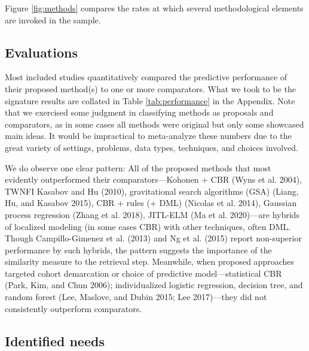 \documentclass{article}
\begin{document}
Figure \ref{fig:methods} compares the rates at which several
methodological elements are invoked in the sample.

\hypertarget{evaluations}{%
\subsection{Evaluations}\label{evaluations}}

Most included studies quantitatively compared the predictive performance
of their proposed method(s) to one or more comparators. What we took to
be the signature results are collated in Table \ref{tab:performance} in
the Appendix. Note that we exercised some judgment in classifying
methods as proposals and comparators, as in some cases all methods were
original but only some showcased main ideas. It would be impractical to
meta-analyze these numbers due to the great variety of settings,
problems, data types, techniques, and choices involved.

We do observe one clear pattern: All of the proposed methods that most
evidently outperformed their comparators---Kohonen + CBR (Wyns et al.
2004), TWNFI Kasabov and Hu (2010), gravitational search algorithms
(GSA) (Liang, Hu, and Kasabov 2015), CBR + rules (+ DML) (Nicolas et al.
2014), Gaussian process regression (Zhang et al. 2018), JITL-ELM (Ma et
al. 2020)---are hybrids of localized modeling (in some cases CBR) with
other techniques, often DML. Though Campillo-Gimenez et al. (2013) and
Ng et al. (2015) report non-superior performance by such hybrids, the
pattern suggests the importance of the similarity measure to the
retrieval step. Meanwhile, when proposed approaches targeted cohort
demarcation or choice of predictive model---statistical CBR (Park, Kim,
and Chun 2006); individualized logistic regression, decision tree, and
random forest (Lee, Maslove, and Dubin 2015; Lee 2017)---they did not
consistently outperform comparators.

\hypertarget{identified-needs}{%
\subsection{Identified needs}\label{identified-needs}}
\end{document}
